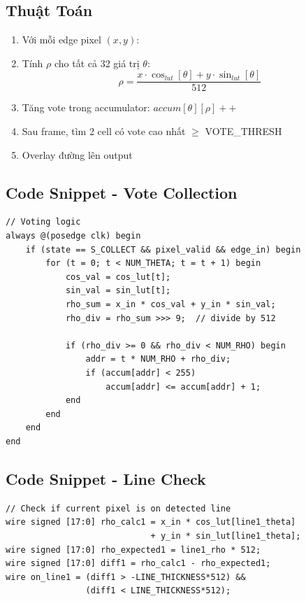 \documentclass[12pt,a4paper]{article}
\begin{document}
\subsection{Thuật Toán}
\begin{enumerate}
    \item Với mỗi edge pixel $(x, y)$:
    \item Tính $\rho$ cho tất cả 32 giá trị $\theta$:
    \begin{equation}
        \rho = \frac{x \cdot \cos_{lut}[\theta] + y \cdot \sin_{lut}[\theta]}{512}
    \end{equation}
    \item Tăng vote trong accumulator: $accum[\theta][\rho]++$
    \item Sau frame, tìm 2 cell có vote cao nhất $\geq$ VOTE\_THRESH
    \item Overlay đường lên output
\end{enumerate}

\subsection{Code Snippet - Vote Collection}
\begin{lstlisting}
// Voting logic
always @(posedge clk) begin
    if (state == S_COLLECT && pixel_valid && edge_in) begin
        for (t = 0; t < NUM_THETA; t = t + 1) begin
            cos_val = cos_lut[t];
            sin_val = sin_lut[t];
            rho_sum = x_in * cos_val + y_in * sin_val;
            rho_div = rho_sum >>> 9;  // divide by 512
            
            if (rho_div >= 0 && rho_div < NUM_RHO) begin
                addr = t * NUM_RHO + rho_div;
                if (accum[addr] < 255)
                    accum[addr] <= accum[addr] + 1;
            end
        end
    end
end
\end{lstlisting}

\subsection{Code Snippet - Line Check}
\begin{lstlisting}
// Check if current pixel is on detected line
wire signed [17:0] rho_calc1 = x_in * cos_lut[line1_theta] 
                             + y_in * sin_lut[line1_theta];
wire signed [17:0] rho_expected1 = line1_rho * 512;
wire signed [17:0] diff1 = rho_calc1 - rho_expected1;
wire on_line1 = (diff1 > -LINE_THICKNESS*512) && 
                (diff1 < LINE_THICKNESS*512);
\end{lstlisting}
\end{document}
